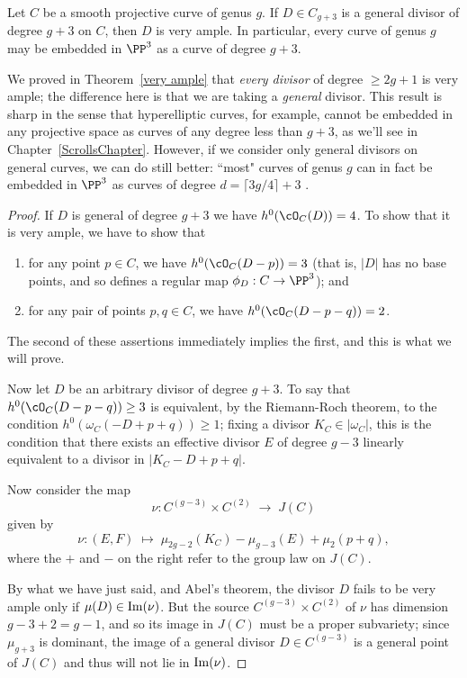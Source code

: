 \begin{theorem}\label{g+3 theorem}
Let $C$ be a smooth projective curve of genus $g$. If $D \in C_{g+3}$ is a general divisor of degree $g+3$ on $C$, then 
$D$ is very ample. In particular, every curve of genus $g$ may be embedded in $\PP^{3}$ as a curve of degree $g+3$.
\end{theorem}

We proved in Theorem~\ref{very ample} that \emph{every divisor} of degree $\geq 2g+1$ is very ample; the difference here is that we are taking a \emph{general} divisor. This result is sharp in the sense that hyperelliptic curves, for example, cannot be embedded in any projective space as curves of any degree less than $g+3$, as we'll see in Chapter~\ref{ScrollsChapter}. However, if we consider only general divisors on general curves, we can do still better: ``most" curves of genus $g$ can in fact be embedded in $\PP^{3}$ as curves of degree $d = \lceil 3g/4 \rceil + 3$ \cite{}.

\begin{proof}
If $D$ is general of degree $g+3$ we have $h^0(\cO_C(D)) = 4$. To show that it is very ample, we have to show that
\begin{enumerate}
\item for any point $p \in C$, we have $h^0(\cO_C(D-p)) = 3$ (that is, $|D|$ has no base points, and so defines a regular map $\phi_D : C \to \PP^3$); and
\item for any pair of points $p, q \in C$, we have $h^0(\cO_C(D-p-q)) = 2$.
\end{enumerate}
The second of these assertions immediately implies the first, and this is what we will prove.

Now let $D$ be an arbitrary divisor of degree $g+3$. To say that $h^0(\cO_C(D-p-q)) \geq 3$ is equivalent, by the Riemann-Roch theorem, to the condition $h^0(\omega_C(-D + p + q)) \geq 1$; fixing a divisor 
$K_{C}\in |\omega_{C}|$, this is the condition that there exists  
an effective divisor $E$ of degree $g-3$ linearly equivalent to a divisor in $|K_C - D + p + q|$. 

Now consider the map 
$$
\nu : C^{(g-3)} \times C^{(2)} \; \to \; J(C)
$$
given by
$$
\nu : (E,F) \; \mapsto \; \mu_{2g-2}(K_C) - \mu_{g-3}(E) + \mu_{2}(p+q), 
$$
where the $+$ and $-$ on the right refer to the group law on $J(C)$. 

By what we have just said, and Abel's theorem, the divisor $D$ fails to be very ample only if
$\mu(D) \in {\rm Im}(\nu)$. But the source $C^{(g-3)} \times C^{(2)}$ of $\nu$ has dimension $g-3+2 = g-1$, and so its image in $J(C)$ must be a proper subvariety; since $\mu_{g+3}$ is dominant, the image of a general divisor $D \in C^{(g-3)}$ is a general point of $J(C)$ and thus will not lie in ${\rm Im}(\nu)$. 
\end{proof}

